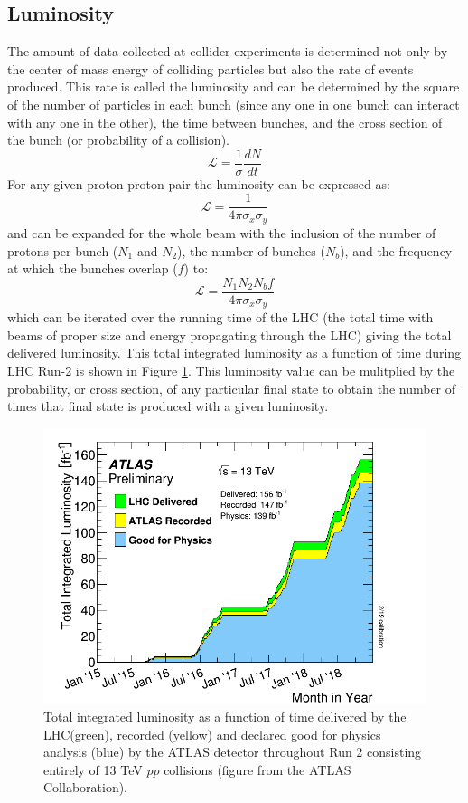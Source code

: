 \subsection{Luminosity}
The amount of data collected at collider experiments is determined not only by the center of mass energy of colliding particles but also the rate of events produced.  This rate is called the luminosity and can be determined by the square of the number of particles in each bunch (since any one in one bunch can interact with any one in the other), the time between bunches, and the cross section of the bunch (or probability of a collision).
\[ \mathcal{L}=\frac{1}{\sigma}\frac{dN}{dt} \]
For any given proton-proton pair the luminosity can be expressed as:
\[ \mathcal{L}=\frac{1}{4\pi \sigma_x \sigma_y} \]
and can be expanded for the whole beam with the inclusion of the number of protons per bunch ($N_1$ and $N_2$), the number of bunches ($N_b$), and the frequency at which the bunches overlap ($f$) to:
\[ \mathcal{L}=\frac{N_1 N_2 N_b f}{4 \pi \sigma_x \sigma_y} \]
which can be iterated over the running time of the LHC (the total time with beams of proper size and energy propagating through the LHC) giving the total delivered luminosity.  This total integrated luminosity as a function of time during LHC Run-2 is shown in Figure \ref{fig:ATLASLumi}.  This luminosity value can be mulitplied by the probability, or cross section, of any particular final state to obtain the number of times that final state is produced with a given luminosity.
\begin{figure}[h!]
	\centering
	\includegraphics[width=.7\columnwidth]{../ThesisImages/LHCImages/ATLASLumi.png}
	\caption{Total integrated luminosity as a function of time delivered by the LHC(green), recorded (yellow) and declared good for physics analysis (blue) by the ATLAS detector throughout Run 2 consisting entirely of 13 TeV $pp$ collisions (figure from the ATLAS Collaboration).}
	\label{fig:ATLASLumi}
\end{figure}


